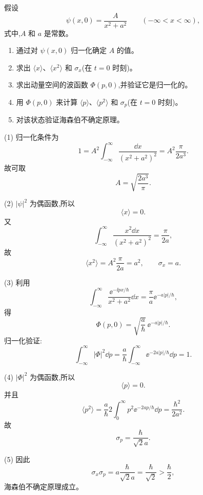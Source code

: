 \begin{question}
假设
\[
\psi(x,0)=\frac{A}{x^2+a^2}\qquad(-\infty<x<\infty),
\]
式中,$A$ 和 $a$ 是常数。
\begin{enumerate}
\item 通过对 $\psi(x,0)$ 归一化确定 $A$ 的值。
\item 求出 $\langle x\rangle$、$\langle x^2\rangle$ 和 $\sigma_x$(在 $t=0$ 时刻)。
\item 求出动量空间的波函数 $\Phi(p,0)$,并验证它是归一化的。
\item 用 $\Phi(p,0)$ 来计算 $\langle p\rangle$、$\langle p^2\rangle$ 和 $\sigma_p$(在 $t=0$ 时刻)。
\item 对该状态验证海森伯不确定原理。
\end{enumerate}
\end{question}
\begin{solution}
(1) 归一化条件为
\[
1=A^2\int_{-\infty}^{\infty}\frac{\dd x}{(x^2+a^2)^2}
=A^2\frac{\pi}{2a^3}.
\]
故可取
\[
\boxed{A=\sqrt{\frac{2a^3}{\pi}}.}
\]

(2) $|\psi|^2$ 为偶函数,所以
\[
\langle x\rangle=0.
\]
又
\[
\int_{-\infty}^{\infty}\frac{x^2\dd x}{(x^2+a^2)^2}=\frac{\pi}{2a},
\]
故
\[
\langle x^2\rangle=A^2\frac{\pi}{2a}=a^2,
\qquad
\boxed{\sigma_x=a.}
\]

(3) 利用
\[
\int_{-\infty}^{\infty}\frac{\ee^{-\ii px/\hbar}}{x^2+a^2}\dd x
=\frac\pi a \ee^{-a|p|/\hbar},
\]
得
\[
\boxed{\Phi(p,0)=\sqrt{\frac a\hbar}\,\ee^{-a|p|/\hbar}.}
\]
归一化验证:
\[
\int_{-\infty}^{\infty}|\Phi|^2\dd p
=\frac a\hbar\int_{-\infty}^{\infty}\ee^{-2a|p|/\hbar}\dd p=1.
\]

(4) $|\Phi|^2$ 为偶函数,所以
\[
\langle p\rangle=0.
\]
并且
\[
\langle p^2\rangle=\frac a\hbar 2\int_0^\infty p^2\ee^{-2ap/\hbar}\dd p
=\frac{\hbar^2}{2a^2}.
\]
故
\[
\boxed{\sigma_p=\frac{\hbar}{\sqrt2a}.}
\]

(5) 因此
\[
\sigma_x\sigma_p=a\frac{\hbar}{\sqrt2a}=\frac\hbar{\sqrt2}>\frac\hbar2,
\]
海森伯不确定原理成立。
\end{solution}

